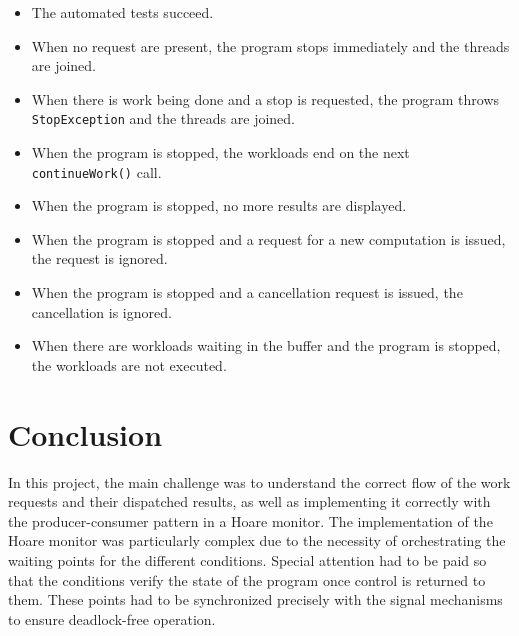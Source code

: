 \documentclass{article}
\begin{document}
    \begin{itemize}
        \item The automated tests succeed.
        \item When no request are present, the program stops immediately and the threads are joined.
        \item When there is work being done and a stop is requested, the program throws \texttt{StopException} and the threads are joined.
        \item When the program is stopped, the workloads end on the next \texttt{continueWork()} call.
        \item When the program is stopped, no more results are displayed.
        \item When the program is stopped and a request for a new computation is issued, the request is ignored.
        \item When the program is stopped and a cancellation request is issued, the cancellation is ignored.
        \item When there are workloads waiting in the buffer and the program is stopped, the workloads are not executed.
    \end{itemize}

    \section*{Conclusion}

    In this project, the main challenge was to understand the correct flow of the work requests and their dispatched results, as well as implementing it correctly with the producer-consumer pattern in a Hoare monitor.
    The implementation of the Hoare monitor was particularly complex due to the necessity of orchestrating the waiting points for the different conditions.
    Special attention had to be paid so that the conditions verify the state of the program once control is returned to them.
    These points had to be synchronized precisely with the signal mechanisms to ensure deadlock-free operation.
\end{document}
